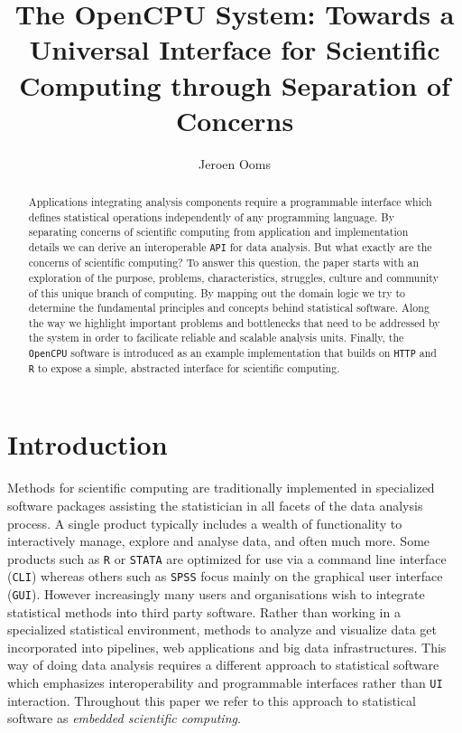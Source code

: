 \documentclass{article}
\author{Jeroen Ooms}
\title{The OpenCPU System: Towards a Universal Interface for Scientific Computing through Separation of Concerns}
\newcommand{\R}{\texttt{R}\xspace}
\newcommand{\SPSS}{\texttt{SPSS}\xspace}
\newcommand{\HTTP}{\texttt{HTTP}\xspace}
\newcommand{\GUI}{\texttt{GUI}\xspace}
\newcommand{\CLI}{\texttt{CLI}\xspace}
\newcommand{\UI}{\texttt{UI}\xspace}
\newcommand{\API}{\texttt{API}\xspace}
\newcommand{\OpenCPU}{\texttt{OpenCPU}\xspace}
\begin{document}
\maketitle

\begin{abstract}
Applications integrating analysis components require a programmable interface which defines statistical operations independently of any programming language. By separating concerns of scientific computing from application and implementation details we can derive an interoperable \API for data analysis. But what exactly are the concerns of scientific computing? To answer this question, the paper starts with an exploration of the purpose, problems, characteristics, struggles, culture and community of this unique branch of computing. By mapping out the domain logic we try to determine the fundamental principles and concepts behind statistical software. Along the way we highlight important problems and bottlenecks that need to be addressed by the system in order to facilicate reliable and scalable analysis units. Finally, the \OpenCPU software is introduced as an example implementation that builds on \HTTP and \R to expose a simple, abstracted interface for scientific computing.
\end{abstract}

\section{Introduction}

Methods for scientific computing are traditionally implemented in specialized software packages assisting the statistician in all facets of the data analysis process. A single product typically includes a wealth of functionality to interactively manage, explore and analyse data, and often much more. Some products such as \R or \texttt{STATA} are optimized for use via a command line interface (\CLI) whereas others such as \SPSS focus mainly on the graphical user interface (\GUI). However increasingly many users and organisations wish to integrate statistical methods into third party software. Rather than working in a specialized statistical environment, methods to analyze and visualize data get incorporated into pipelines, web applications and big data infrastructures. This way of doing data analysis requires a different approach to statistical software which emphasizes interoperability and programmable interfaces rather than \UI interaction. Throughout this paper we refer to this approach to statistical software as \emph{embedded scientific computing}.
\end{document}
